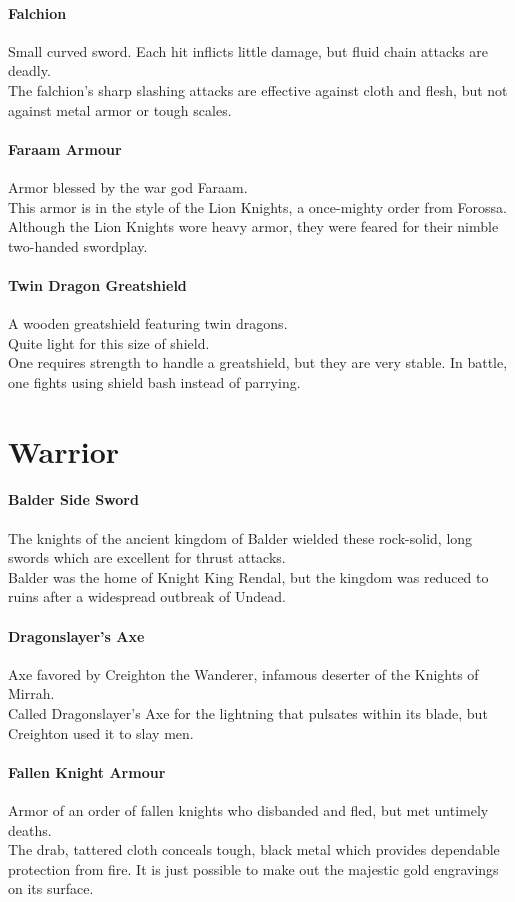 \documentclass[twocolumn,a4paper]{article}
\begin{document}
\paragraph{Falchion}
Small curved sword. Each hit inflicts little damage, but fluid chain attacks are deadly.\\
The falchion's sharp slashing attacks are effective against cloth and flesh, but not against metal armor or tough scales.
\paragraph{Faraam Armour}
Armor blessed by the war god Faraam.\\
This armor is in the style of the Lion Knights, a once-mighty order from Forossa. Although the Lion Knights wore heavy armor, they were feared for their nimble two-handed swordplay.
\paragraph{Twin Dragon Greatshield}
A wooden greatshield featuring twin dragons.\\
Quite light for this size of shield.\\
One requires strength to handle a greatshield, but they are very stable. In battle, one fights using shield bash instead of parrying.
\section*{Warrior}
\paragraph{Balder Side Sword}
The knights of the ancient kingdom of Balder wielded these rock-solid, long swords which are excellent for thrust attacks.\\
Balder was the home of Knight King Rendal, but the kingdom was reduced to ruins after a widespread outbreak of Undead.
\paragraph{Dragonslayer's Axe}
Axe favored by Creighton the Wanderer, infamous deserter of the Knights of Mirrah.\\
Called Dragonslayer's Axe for the lightning that pulsates within its blade, but Creighton used it to slay men.
\paragraph{Fallen Knight Armour}
Armor of an order of fallen knights who disbanded and fled, but met untimely deaths.\\
The drab, tattered cloth conceals tough, black metal which provides dependable protection from fire. It is just possible to make out the majestic gold engravings on its surface.
\end{document}
